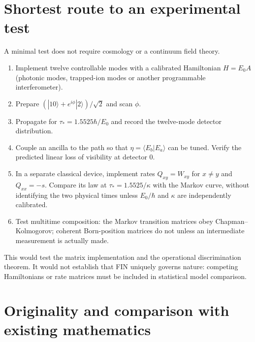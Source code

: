 \documentclass[11pt,a4paper]{article}
\theoremstyle{definition}
\theoremstyle{remark}
\begin{document}
\section{Shortest route to an experimental test}

A minimal test does not require cosmology or a continuum field theory.

\begin{enumerate}
\item Implement twelve controllable modes with a calibrated Hamiltonian $H=E_0A$ (photonic modes, trapped-ion modes or another programmable interferometer).
\item Prepare $(|10\rangle+e^{i\phi}|2\rangle)/\sqrt2$ and scan $\phi$.
\item Propagate for $\tau_*=1.5525\hbar/E_0$ and record the twelve-mode detector distribution.
\item Couple an ancilla to the path so that $\eta=\langle E_b|E_a\rangle$ can be tuned. Verify the predicted linear loss of visibility at detector $0$.
\item In a separate classical device, implement rates $Q_{xy}=W_{xy}$ for $x\ne y$ and $Q_{xx}=-s$. Compare its law at $\tau_*=1.5525/\kappa$ with the Markov curve, without identifying the two physical times unless $E_0/\hbar$ and $\kappa$ are independently calibrated.
\item Test multitime composition: the Markov transition matrices obey Chapman--Kolmogorov; coherent Born-position matrices do not unless an intermediate measurement is actually made.
\end{enumerate}

This would test the matrix implementation and the operational discrimination theorem. It would not establish that FIN uniquely governs nature: competing Hamiltonians or rate matrices must be included in statistical model comparison.

\section{Originality and comparison with existing mathematics}
\end{document}
